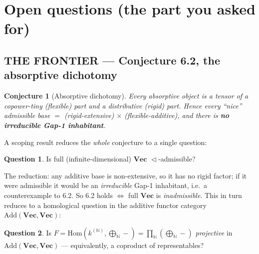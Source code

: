 \documentclass[11pt]{article}
\theoremstyle{plain}
\newtheorem{conjecture}{Conjecture}
\theoremstyle{definition}
\newtheorem{question}{Question}
\theoremstyle{remark}
\newcommand{\Vect}{\mathbf{Vec}}
\newcommand{\Add}{\mathrm{Add}}
\renewcommand{\lhd}{\vartriangleleft}
\newcommand{\Hom}{\mathrm{Hom}}
\begin{document}
\section{Open questions (the part you asked for)}

\subsection*{THE FRONTIER --- Conjecture 6.2, the absorptive dichotomy}

\begin{conjecture}[Absorptive dichotomy]
Every absorptive object is a tensor of a \emph{copower-tiny} (flexible) part and a \emph{distributive}
(rigid) part. Hence every ``nice'' admissible base $=$ (rigid-extensive) $\times$ (flexible-additive),
and there is \textbf{no irreducible Gap-1 inhabitant}.
\end{conjecture}

\noindent A scoping result reduces the \emph{whole} conjecture to a single question:
\begin{question}
Is full (infinite-dimensional) $\Vect$ $\lhd$-admissible?
\end{question}
The reduction: any additive base is non-extensive, so it has no rigid factor; if it were admissible it
would be an \emph{irreducible} Gap-1 inhabitant, i.e.\ a counterexample to 6.2. So 6.2 holds
$\iff$ full $\Vect$ is \emph{inadmissible}. This in turn reduces to a homological question in the
additive functor category $\Add(\Vect,\Vect)$:
\begin{question}
Is $F=\Hom(k^{(\mathbb{N})},\bigoplus_{\mathbb{N}}-)=\prod_{\mathbb{N}}(\bigoplus_{\mathbb{N}}-)$
\emph{projective} in $\Add(\Vect,\Vect)$ --- equivalently, a coproduct of representables?
\end{question}
\end{document}
